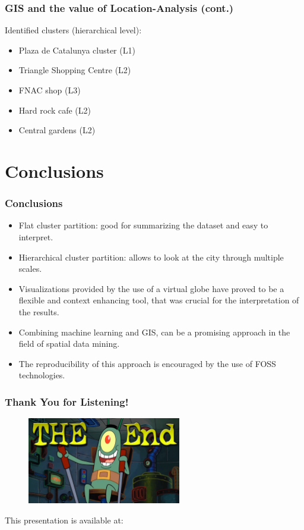 \documentclass[hyperref={pdfpagelabels=true}]{beamer}
\begin{document}
\begin{frame}
\frametitle{GIS and the value of Location-Analysis (cont.)}
    Identified clusters (hierarchical level):
    \begin{itemize}    
      \item<1->Plaza de Catalunya cluster (L1)
      \item<1->Triangle Shopping Centre (L2)
      \item<1->FNAC shop (L3)
      \item<1->Hard rock cafe (L2)
      \item<1->Central gardens (L2)
    \end{itemize}
\end{frame}

\section{Conclusions}
\begin{frame}
\frametitle{Conclusions}
    \begin{itemize}    
      \item<2->Flat cluster partition: good for summarizing the dataset and easy to interpret.
      \item<3->Hierarchical cluster partition: allows to look at the city through multiple scales.%
      \item<4->Visualizations provided by the use of a virtual globe have proved to be a flexible and context enhancing tool, that was crucial for the interpretation of the results.
      \item<5->Combining machine learning and GIS, can be a promising approach in the field of spatial data mining.
      \item<6->The reproducibility of this approach is encouraged by the use of FOSS technologies.      
     \end{itemize}
\end{frame}

\begin{frame}
\frametitle{Thank You for Listening!}
    \begin{figure}   
      \includegraphics[width=0.6\textwidth]{end.jpg}      
    \end{figure}   
    This presentation is available at: 
      \vspace{5mm}    
\end{frame}
\end{document}
